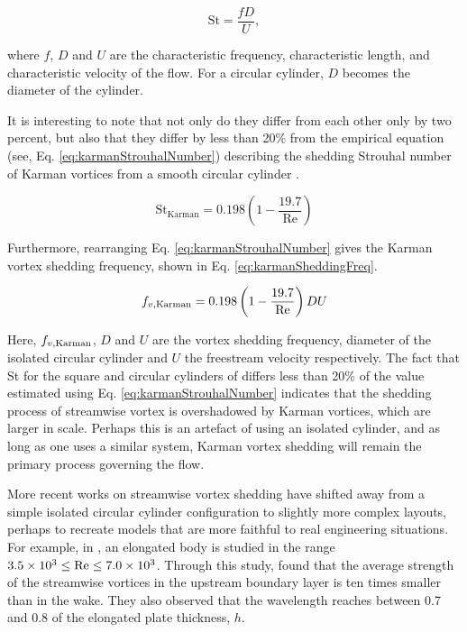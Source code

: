 \documentclass[oneside]{utmthesis}
\begin{document}
\begin{equation}
  \text{St} = \frac{f D}{U},
  \label{eq:stDef}
\end{equation}

\noindent where $f$, $D$ and $U$ are the characteristic frequency, characteristic length, and characteristic velocity of the flow. For a circular cylinder, $D$ becomes the diameter of the cylinder.

It is interesting to note that not only do they differ from each other only by two percent, but also that they differ by less than 20\% from the empirical equation (see, Eq. \ref{eq:karmanStrouhalNumber}) describing the shedding Strouhal number of Karman vortices from a smooth circular cylinder \citep{Blevins1990}.

\begin{equation}
  \text{St}_{\text{Karman}} = 0.198 \left( 1 - \frac{19.7}{\text{Re}} \right)
  \label{eq:karmanStrouhalNumber}
\end{equation}

Furthermore, rearranging Eq. \ref{eq:karmanStrouhalNumber} gives the Karman vortex shedding frequency, shown in Eq. \ref{eq:karmanSheddingFreq}.

\begin{equation}
  f_{v,\text{Karman}} = 0.198 \left( 1 - \frac{19.7}{\text{Re}} \right) DU
  \label{eq:karmanSheddingFreq}
\end{equation}

\noindent Here, $f_{v,\text{Karman}}$, $D$ and $U$ are the vortex shedding frequency, diameter of the isolated circular cylinder and $U$ the freestream velocity respectively. The fact that St for the square and circular cylinders of \citet{Agbaglah2019} differs less than 20\% of the value estimated using Eq. \ref{eq:karmanStrouhalNumber} indicates that the shedding process of streamwise vortex is overshadowed by Karman vortices, which are larger in scale. Perhaps this is an artefact of using an isolated cylinder, and as long as one uses a similar system, Karman vortex shedding will remain the primary process governing the flow.

More recent works on streamwise vortex shedding have shifted away from a simple isolated circular cylinder configuration to slightly more complex layouts, perhaps to recreate models that are more faithful to real engineering situations. For example, in \citet{Gibeau2018}, an elongated body is studied in the range $3.5 \times 10^{3} \leq \text{Re} \leq 7.0 \times 10^{3}$. Through this study, \citet{Gibeau2018} found that the average strength of the streamwise vortices in the upstream boundary layer is ten times smaller than in the wake. They also observed that the wavelength reaches between 0.7 and 0.8 of the elongated plate thickness, $h$.
\end{document}
